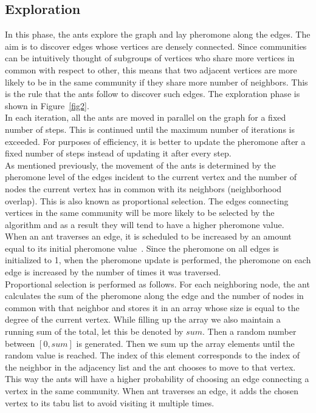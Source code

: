 \begin{spacing}{1.5}
\section{Exploration}

In this phase, the ants explore the graph and lay pheromone along the edges. The aim is to discover edges whose vertices are densely connected. Since communities can be intuitively thought of subgroups of vertices who share more vertices in common with respect to other, this means that two adjacent vertices are more likely to be in the same community if they share more number of neighbors. This is the rule that the ants follow to discover such edges. The exploration phase is shown in Figure~\ref{fig2}.\\

\indent In each iteration, all the ants are moved in parallel on the graph for a fixed number of steps. This is continued until the maximum number of iterations is exceeded. For purposes of efficiency, it is better to update the pheromone after a fixed number of steps instead of updating it after every step.\\
\indent As mentioned previously, the movement of the ants is determined by the pheromone level of the edges incident to the current vertex and the number of nodes the current vertex has in common with its neighbors (neighborhood overlap). This is also known as proportional selection. The edges connecting vertices in the same community will be more likely to be selected by the algorithm and as a result they will tend to have a higher pheromone value. \\
\indent When an ant traverses an edge, it is scheduled to be increased by an amount equal to its initial pheromone value~\cite{5910378}. Since the pheromone on all edges is initialized to 1, when the pheromone update is performed, the pheromone on each edge is increased by the number of times it was traversed.\\
\indent Proportional selection is performed as follows. For each neighboring node, the ant calculates the sum of the pheromone along the edge and the number of nodes in common with that neighbor and stores it in an array whose size is equal to the degree of the current vertex. While filling up the array we also maintain a running sum of the total, let this be denoted by $sum$. Then a random number between $[0, sum]$ is generated. Then we sum up the array elements until the random value is reached. The index of this element corresponds to the index of the neighbor in the adjacency list and the ant chooses to move to that vertex. This way the ants will have a higher probability of choosing an edge connecting a vertex in the same community. When ant traverses an edge, it adds the chosen vertex to its tabu list to avoid visiting it multiple times.\\

\end{spacing}
